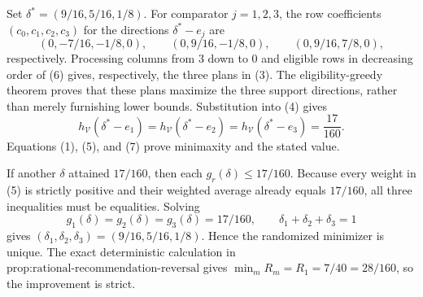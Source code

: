 Set \(\delta^*=(9/16,5/16,1/8)\). For comparator \(j=1,2,3\), the row coefficients \((c_0,c_1,c_2,c_3)\) for the directions \(\delta^*-e_j\) are
\[
 (0,-7/16,-1/8,0),\qquad
 (0,9/16,-1/8,0),\qquad
 (0,9/16,7/8,0),                                          \tag{6}
\]
respectively. Processing columns from \(3\) down to \(0\) and eligible rows in decreasing order of (6) gives, respectively, the three plans in (3). The eligibility-greedy theorem proves that these plans maximize the three support directions, rather than merely furnishing lower bounds. Substitution into (4) gives
\[
 h_{\mathcal V}(\delta^*-e_1)
 =h_{\mathcal V}(\delta^*-e_2)
 =h_{\mathcal V}(\delta^*-e_3)=\frac{17}{160}.            \tag{7}
\]
Equations (1), (5), and (7) prove minimaxity and the stated value.

If another \(\delta\) attained \(17/160\), then each \(g_r(\delta)\le17/160\). Because every weight in (5) is strictly positive and their weighted average already equals \(17/160\), all three inequalities must be equalities. Solving
\[
 g_1(\delta)=g_2(\delta)=g_3(\delta)=17/160,\qquad
 \delta_1+\delta_2+\delta_3=1                            \tag{8}
\]
gives \((\delta_1,\delta_2,\delta_3)=(9/16,5/16,1/8)\). Hence the randomized minimizer is unique. The exact deterministic calculation in \(\text{prop:rational-recommendation-reversal}\) gives \(\min_mR_m=R_1=7/40=28/160\), so the improvement is strict.

